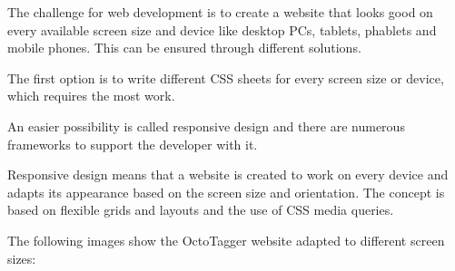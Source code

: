 The challenge for web development is to create a website that looks good on every available screen size and device like desktop PCs, tablets, phablets and mobile phones. This can be ensured through different solutions.

The first option is to write different CSS sheets for every screen size or device, which requires the most work.

An easier possibility is called responsive design and there are numerous frameworks to support the developer with it. 

Responsive design means that a website is created to work on every device and adapts its appearance based on the screen size and orientation. The concept is based on flexible grids and layouts and the use of CSS media queries.

The following images show the OctoTagger website adapted to different screen sizes:

